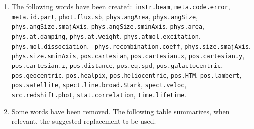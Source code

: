 \documentclass[11pt,a4paper]{ivoa}
\begin{document}
\begin{enumerate}
\item The following words have been created: {\tt instr.beam}, {\tt meta.code.error}, {\tt meta.id.part}, {\tt phot.flux.sb}, 
{\tt phys.angArea}, {\tt phys.angSize}, {\tt phys.angSize.smajAxis}, {\tt phys.angSize.sminAxis}, {\tt phys.area}, 
{\tt phys.at.damping}, {\tt phys.at.weight}, {\tt phys.atmol.excitation}, {\tt phys.mol.dissociation}, {\tt 
phys.recombination.coeff}, {\tt phys.size.smajAxis}, {\tt phys.size.sminAxis}, {\tt pos.cartesian}, {\tt pos.cartesian.x},
{\tt pos.cartesian.y}, {\tt pos.cartesian.z}, {\tt pos.distance}, {\tt pos.eq.spd}, {\tt pos.galactocentric}, {\tt 
pos.geocentric}, {\tt pos.healpix}, {\tt pos.heliocentric}, {\tt pos.HTM}, {\tt pos.lambert}, {\tt pos.satellite}, 
{\tt spect.line.broad.Stark}, {\tt spect.veloc}, {\tt src.redshift.phot}, {\tt stat.correlation}, {\tt time.lifetime}.
\item Some words have been removed. The following table summarizes, when relevant, the suggested replacement to be used. 


\end{enumerate}
\end{document}
